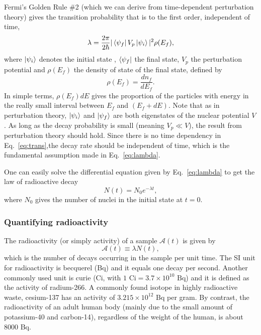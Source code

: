 \documentclass[nofootinbib,preprint,aip,pra]{revtex4-1}
\begin{document}
        Fermi's Golden Rule \#2 (which we can derive from time-dependent
        perturbation theory)
        gives the transition probability that is to the first order, independent of time,
        \begin{equation}
            \label{eq:trans}
            \lambda = \frac{2\pi}{2\hbar}|\bra{\psi_f}V_p\ket{\psi_i}|^2\rho(E_f),
        \end{equation}
        where $\ket{\psi_i}$ denotes the initial state , $\bra{\psi_f}$ the final state, $V_p$ the perturbation
        potential and $\rho(E_f)$ the density of state of the final state, defined by
        \begin{equation}
            \rho(E_f) = \frac{dn_f}{dE_f}.
        \end{equation}
        In simple terms, $\rho(E_f)dE$ gives the proportion of the particles with energy in the
        really small interval between
        $E_f$ and $(E_f+dE)$.
        Note that as in perturbation theory, $\ket{\psi_i}$ and
        $\ket{\psi_f}$ are both eigenstates of the nuclear potential $V$. As long as
        the decay probability is small (meaning $V_p\ll V$), the result from perturbation theory should hold. Since
        there is no time dependency in Eq.~\ref{eq:trans},the
        decay rate should be independent of time, which is the fundamental assumption made in
        Eq.~\ref{eq:lambda}.
        
        One can easily solve the differential equation given by Eq.~\ref{eq:lambda} to get
        the law of radioactive decay
        \begin{equation}
            N(t) = N_0 e^{-\lambda t},
        \end{equation}
        where $N_0$ gives the number of nuclei in the initial state at $t=0$.


        \subsubsection{Quantifying radioactivity}
        The radioactivity (or simply activity) of a sample $\mathcal{A}(t)$ is given by
        \begin{equation}
            \label{eq:act}
            \mathcal{A}(t)\equiv \lambda N(t),
        \end{equation}
        which is the number of decays occurring in the sample per unit time. The SI
        unit for radioactivity is becquerel (Bq) and it equals one decay per second. Another commonly used
        unit is curie (Ci, with $1\text{ Ci}=3.7\times 10^{10}\text{ Bq}$) and it is defined as
        the activity of radium-266. A commonly found isotope in highly radioactive waste,
        cesium-137 has an activity of $3.215\times 10^{12}$ Bq
        per gram. By contrast, the radioactivity of an adult human body (mainly due to the small amount of 
        potassium-40 and carbon-14), regardless of the weight of the human, is about $8000$ Bq.
\end{document}
